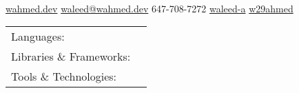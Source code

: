 \documentclass[]{awesome-cv}
\begin{document}
    
\begin{center}
	  \\
	\vspace{2mm}
	\href{https://wahmed.dev}{{\textcolor{darkblue}{\faGlobe} wahmed.dev}}
	\hspace{2mm}
	\href{mailto:waleed@wahmed.dev}{{\textcolor{darkblue}{\faEnvelope} waleed@wahmed.dev}}
	\hspace{2mm} 
	{\textcolor{darkblue}{\faPhone} 647-708-7272} 
	\hspace{2mm}
	\href{https://www.linkedin.com/in/waleed-a}{{\textcolor{darkblue}{\faLinkedin} waleed-a}}
	\hspace{2mm} 
	\href{https://github.com/w29ahmed}{{\textcolor{darkblue}{\faGithub} w29ahmed}}
\end{center}
\vspace{-4mm}
\begin{cventries}
	\cventry
	{}
	{\def\arraystretch{1.15}{\begin{tabular}{ l l }
		Languages:  & \hspace{1mm} {\skill{ C++, C, Python, JavaScript, Java, C\#, HTML, CSS, SQL, QML, Assembly}} \\
		Libraries \& Frameworks:  & \hspace{1mm} {\skill{ ROS, OpenCV, Qt, Node, React, Express, Flask, Google Test, Thrift, Hadoop, Kafka}} \\
		Tools \& Technologies:  & \hspace{1mm} {\skill{ Git, Linux, QNX, Perforce, SVN, MongoDB, Jenkins, Docker, LaTeX, Jira}} \\
		\end{tabular}}}
	{}
	{}
	{}
\end{cventries}
\end{document}
